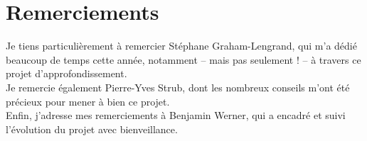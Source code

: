 \section*{Remerciements}

Je tiens particulièrement à remercier Stéphane Graham-Lengrand, qui m'a dédié beaucoup de temps cette année, notamment -- mais pas seulement ! -- à travers ce projet d'approfondissement.\\

Je remercie également Pierre-Yves Strub, dont les nombreux conseils m'ont été précieux pour mener à bien ce projet.\\

Enfin, j'adresse mes remerciements à Benjamin Werner, qui a encadré et suivi l'évolution du projet avec bienveillance.